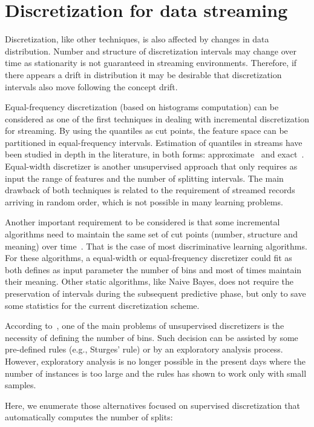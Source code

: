 \documentclass[preprint,12pt]{elsarticle}
\begin{document}
\section{Discretization for data streaming}

Discretization, like other techniques, is also affected by changes in data distribution. Number and structure of discretization intervals may change over time as stationarity is not guaranteed in streaming environments. Therefore, if there appears a drift in distribution it  may be desirable that discretization intervals also move following the concept drift.

Equal-frequency discretization (based on histograms computation) can be considered as one of the first techniques in dealing with incremental discretization for streaming. By using the quantiles as cut points, the feature space can be partitioned in equal-frequency intervals. Estimation of quantiles in streams have been studied in depth in the literature, in both forms: approximate~\cite{ben10, webb14} and exact~\cite{gupta03, guha09}. Equal-width discretizer is another unsupervised approach that only requires as input the range of features and the number of splitting intervals. The main drawback of both techniques is related to the requirement of streamed records arriving in random order, which is not possible in many learning problems. 

Another important requirement to be considered is that some incremental algorithms need to maintain the same set of cut points (number, structure and meaning) over time~\cite{webb14}. That is the case of most discriminative learning algorithms. For these algorithms, a equal-width or equal-frequency discretizer could fit as both defines as input parameter the number of bins and most of times maintain their meaning. Other static algorithms, like Naive Bayes, does not require the preservation of intervals during the subsequent predictive phase, but only to save some statistics for the current discretization scheme. 

According to~\cite{gama06}, one of the main problems of unsupervised discretizers is the necessity of defining the number of bins. Such decision can be assisted by some pre-defined rules (e.g., Sturges' rule) or by an exploratory analysis process. However, exploratory analysis is no longer possible in the present days where the number of instances is too large and the rules has shown to work only with small samples.

Here, we enumerate those alternatives focused on supervised discretization that automatically computes the number of splits:
\end{document}
